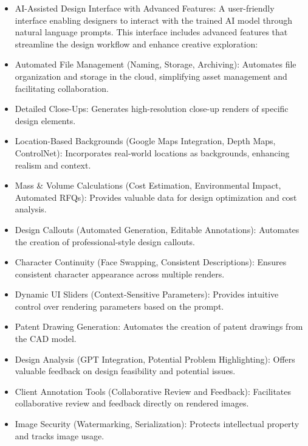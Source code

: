 \documentclass{article}
\begin{document}
\begin{itemize}
    \item AI-Assisted Design Interface with Advanced Features: A user-friendly interface enabling designers to interact with the trained AI model through natural language prompts. This interface includes advanced features that streamline the design workflow and enhance creative exploration:

    \item Automated File Management (Naming, Storage, Archiving): Automates file organization and storage in the cloud, simplifying asset management and facilitating collaboration.

    \item Detailed Close-Ups: Generates high-resolution close-up renders of specific design elements.

    \item Location-Based Backgrounds (Google Maps Integration, Depth Maps, ControlNet): Incorporates real-world locations as backgrounds, enhancing realism and context.

    \item Mass & Volume Calculations (Cost Estimation, Environmental Impact, Automated RFQs): Provides valuable data for design optimization and cost analysis.

    \item Design Callouts (Automated Generation, Editable Annotations): Automates the creation of professional-style design callouts.

    \item Character Continuity (Face Swapping, Consistent Descriptions): Ensures consistent character appearance across multiple renders.

    \item Dynamic UI Sliders (Context-Sensitive Parameters): Provides intuitive control over rendering parameters based on the prompt.

    \item Patent Drawing Generation: Automates the creation of patent drawings from the CAD model.

    \item Design Analysis (GPT Integration, Potential Problem Highlighting): Offers valuable feedback on design feasibility and potential issues.

    \item Client Annotation Tools (Collaborative Review and Feedback): Facilitates collaborative review and feedback directly on rendered images.

    \item Image Security (Watermarking, Serialization): Protects intellectual property and tracks image usage.


\end{itemize}
\end{document}
